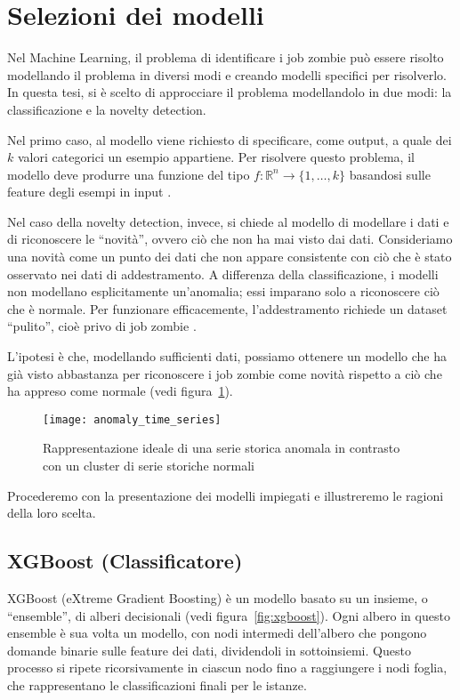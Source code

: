 \section{Selezioni dei modelli}
\label{sec:novelty_detection}

Nel Machine Learning, il problema di identificare i job zombie può essere
risolto modellando il problema in diversi modi e creando modelli specifici per
risolverlo. In questa tesi, si è scelto di approcciare il problema
modellandolo in due modi: la classificazione e la novelty detection.

Nel primo caso, al modello viene richiesto di specificare, come output, a
quale dei $k$ valori categorici un esempio appartiene. Per risolvere questo
problema, il modello deve produrre una funzione del tipo
$f:\mathbb{R}^n\to\{1,\ldots,k\}$ basandosi sulle feature degli esempi in
input \cite{Goodfellow2016}.

Nel caso della novelty detection, invece, si chiede al modello di modellare i
dati e di riconoscere le ``novità'', ovvero ciò che non ha mai visto dai dati.
Consideriamo una novità come un punto dei dati che non appare consistente con
ciò che è stato osservato nei dati di addestramento. A differenza della
classificazione, i  modelli non modellano esplicitamente un'anomalia; essi
imparano solo a riconoscere ciò che è normale. Per funzionare efficacemente,
l'addestramento richiede un dataset ``pulito'', cioè privo di job zombie
\cite{geron2019, pimentel2014}.

L'ipotesi è che, modellando sufficienti dati, possiamo ottenere un modello che
ha già visto abbastanza per riconoscere i job zombie come novità rispetto a
ciò che ha appreso come normale (vedi figura~\ref{fig:anomaly_detection}).

\begin{figure}[!ht]
    \centering
    \texttt{[image: anomaly\_time\_series]}
    \caption{Rappresentazione ideale di una serie storica anomala in contrasto
    con un cluster di serie storiche normali}
    \label{fig:anomaly_detection}
\end{figure}

Procederemo con la presentazione dei modelli impiegati e illustreremo le
ragioni della loro scelta.

\subsection{XGBoost (Classificatore)}

XGBoost (eXtreme Gradient Boosting) è un modello basato su un insieme, o
``ensemble'', di alberi decisionali (vedi figura~\ref{fig:xgboost}). Ogni
albero in questo ensemble è sua volta un modello, con nodi intermedi
dell'albero che pongono domande binarie sulle feature dei dati, dividendoli in
sottoinsiemi. Questo processo si ripete ricorsivamente in ciascun nodo fino a
raggiungere i nodi foglia, che rappresentano le classificazioni finali per le
istanze.

